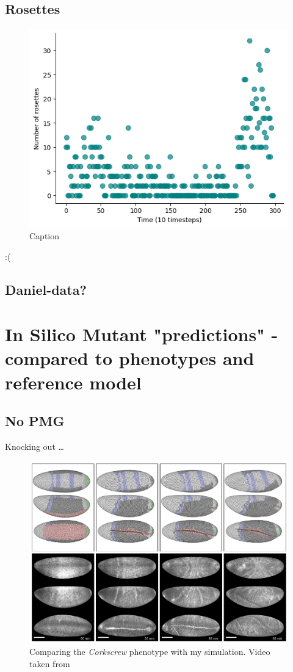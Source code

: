 \subsection{Rosettes}
\begin{figure}[H]
    \centering
    \includegraphics[width=0.5\linewidth]{chapters/Results/figures/rosettes_time.png}
    \caption{Caption}
    \label{fig:enter-label}
\end{figure}

:(

\subsection{Daniel-data?}
\newpage
\section{In Silico Mutant "predictions" - compared to phenotypes and reference model}
\subsection{No PMG}

Knocking out \dots

\begin{figure}[H]
    \centering
    \includegraphics[width=1\linewidth]{chapters/Results/figures/corkscrew_comparison.png}
    \caption{Comparing the \textit{Corkscrew} phenotype with my simulation. Video taken from \cite{smits2023maintaining}}
    \label{fig:corkscrew-comparison}
\end{figure}
